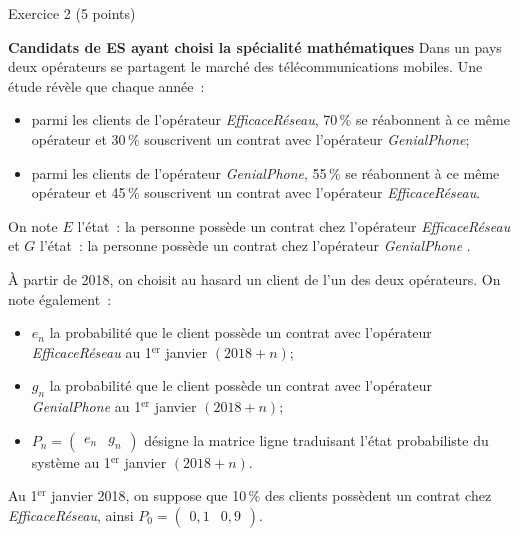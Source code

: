 
\begin{h2}Exercice 2 (5 points)\end{h2}
\textbf{Candidats de ES ayant choisi la spécialité \og mathématiques \fg{} }
\medskip
Dans un pays deux opérateurs se partagent le marché des télécommunications mobiles. Une étude révèle que chaque année~:
\begin{itemize}
     \item parmi les clients de l'opérateur \emph{EfficaceRéseau}, 70\,\% se réabonnent à ce même opérateur et 30\,\% souscrivent un contrat avec l'opérateur \emph{GenialPhone};
     \item parmi les clients de l'opérateur \emph{GenialPhone}, 55\,\% se réabonnent à ce même opérateur et 45\,\% souscrivent un contrat avec l'opérateur \emph{EfficaceRéseau}.
\end{itemize}
\bigskip
On note $E$ l'état~: \og la personne possède un contrat chez l'opérateur \emph{EfficaceRéseau} \fg{} et $G$ l'état~: \og la personne possède un contrat chez l'opérateur \emph{GenialPhone} \fg{}.
\par
À partir de 2018, on choisit au hasard un client de l'un des deux opérateurs.
\bigskip
On note également~:
\begin{itemize}
     \item $e_n$ la probabilité que le client possède un contrat avec l'opérateur \emph{EfficaceRéseau} au 1${^\text{er}}$ janvier $(2018+n)$;
     \item $g_n$ la probabilité que le client possède un contrat avec l'opérateur \emph{GenialPhone} au 1${^\text{er}}$ janvier $(2018+n)$;
     \item $P_n = \begin{pmatrix} e_n & g_n \end{pmatrix}$ désigne la matrice ligne traduisant l'état probabiliste du système au 1${^\text{er}}$ janvier $(2018+n)$.
\end{itemize}
\medskip
Au 1${^\text{er}}$ janvier 2018, on suppose que 10\,\% des clients possèdent un contrat chez \emph{EfficaceRéseau}, ainsi $P_0 = \begin{pmatrix} 0,1 & 0,9 \end{pmatrix}$.
\bigskip
